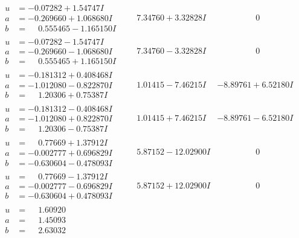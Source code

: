 \documentclass[1p]{elsarticle_modified}
\theoremstyle{definition}
\begin{document}
$$\begin{array}{c|c|c}
\begin{aligned}
u &= -0.07282 + 1.54747 I \\
a &= -0.269660 + 1.068680 I \\
b &= \phantom{-}0.555465 - 1.165150 I\end{aligned}
 & \phantom{-}7.34760 + 3.32828 I & \phantom{-0.000000 } 0 \\ \hline\begin{aligned}
u &= -0.07282 - 1.54747 I \\
a &= -0.269660 - 1.068680 I \\
b &= \phantom{-}0.555465 + 1.165150 I\end{aligned}
 & \phantom{-}7.34760 - 3.32828 I & \phantom{-0.000000 } 0 \\ \hline\begin{aligned}
u &= -0.181312 + 0.408468 I \\
a &= -1.012080 - 0.822870 I \\
b &= \phantom{-}1.20306 + 0.75387 I\end{aligned}
 & \phantom{-}1.01415 - 7.46215 I & -8.89761 + 6.52180 I \\ \hline\begin{aligned}
u &= -0.181312 - 0.408468 I \\
a &= -1.012080 + 0.822870 I \\
b &= \phantom{-}1.20306 - 0.75387 I\end{aligned}
 & \phantom{-}1.01415 + 7.46215 I & -8.89761 - 6.52180 I \\ \hline\begin{aligned}
u &= \phantom{-}0.77669 + 1.37912 I \\
a &= -0.002777 + 0.696829 I \\
b &= -0.630604 - 0.478093 I\end{aligned}
 & \phantom{-}5.87152 - 12.02900 I & \phantom{-0.000000 } 0 \\ \hline\begin{aligned}
u &= \phantom{-}0.77669 - 1.37912 I \\
a &= -0.002777 - 0.696829 I \\
b &= -0.630604 + 0.478093 I\end{aligned}
 & \phantom{-}5.87152 + 12.02900 I & \phantom{-0.000000 } 0 \\ \hline\begin{aligned}
u &= \phantom{-}1.60920\phantom{ +0.000000I} \\
a &= \phantom{-}1.45093\phantom{ +0.000000I} \\
b &= \phantom{-}2.63032\phantom{ +0.000000I}\end{aligned}

\end{array}$$
\end{document}
